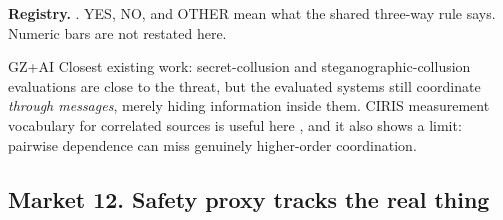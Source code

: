 \begin{predictionresolution}
\textbf{Registry.} . YES, NO, and OTHER mean what the shared three-way rule says. Numeric bars are not restated here.
\end{predictionresolution}
\begin{authbar}{GZ+AI}
Closest existing work: secret-collusion and steganographic-collusion evaluations \autocite{motwani2024secretcollusion,mathew2025steganographiccollusion,vaikuntanathan2026undetectableconversations} are close to the threat, but the evaluated systems still coordinate \emph{through messages}, merely hiding information inside them.
CIRIS measurement vocabulary for correlated sources is useful here \autocite{ciris2026howitworks}, and it also shows a limit: pairwise dependence can miss genuinely higher-order coordination.
\end{authbar}
\authbarneedspace

\subsection{Market 12. Safety proxy tracks the real thing}
\label{sec:appp-m12}

